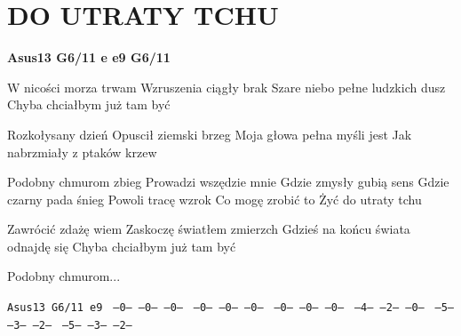 \documentclass[../../../songbook.tex]{subfiles}
\begin{document}
\TabPositions{8cm} %
\section*{DO UTRATY TCHU}
{}
\vspace{0.5cm}
{\color{red}\textbf{Asus13 G6/11  e e9 G6/11} } \newline

W nicości morza trwam		 \newline
Wzruszenia ciągły brak			\newline
Szare niebo pełne ludzkich dusz			\newline
Chyba chciałbym już tam być			\newline

Rozkołysany dzień			\newline
Opuscił ziemski brzeg			\newline
Moja głowa pełna myśli jest			\newline
Jak nabrzmiały z ptaków krzew			\newline
  
\-\hspace{1cm} Podobny chmurom zbieg		 \newline
\-\hspace{1cm} Prowadzi wszędzie mnie			\newline
\-\hspace{1cm} Gdzie zmysły gubią sens			\newline
\-\hspace{1cm} Gdzie czarny pada śnieg			\newline
\-\hspace{1cm} Powoli tracę wzrok			\newline
\-\hspace{1cm} Co mogę zrobić to			\newline
\-\hspace{1cm} Żyć do utraty tchu			\newline

Zawrócić zdażę wiem			\newline
Zaskoczę światłem zmierzch			\newline
Gdzieś na końcu świata odnajdę się			\newline
Chyba chciałbym już tam być			\newline

\-\hspace{1cm} Podobny chmurom...

 \texttt{Asus13			G6/11		e9	}	\newline
 \texttt{---0---		---0---		---0---	}	\newline
 \texttt{---0---		---0---		---0---	}	\newline
 \texttt{---0---		---0---		---0---	}	\newline
 \texttt{---4---		---2---		---0---	}	\newline
 \texttt{---5---		---3---		---2---	}	\newline
 \texttt{---5---		---3---		---2---	}	\newline
\end{document}
